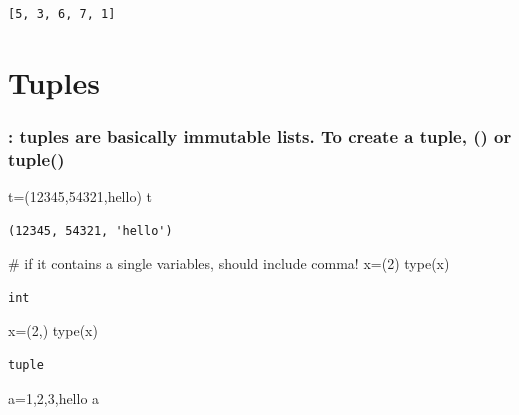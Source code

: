 \documentclass[
  a4paper,
  DIV=11,
  numbers=noendperiod]{scrreprt}
\newenvironment{Shaded}{\begin{snugshade}}{\end{snugshade}}
\newcommand{\BuiltInTok}[1]{\textcolor[rgb]{0.00,0.23,0.31}{#1}}
\newcommand{\CommentTok}[1]{\textcolor[rgb]{0.37,0.37,0.37}{#1}}
\newcommand{\DecValTok}[1]{\textcolor[rgb]{0.68,0.00,0.00}{#1}}
\newcommand{\NormalTok}[1]{\textcolor[rgb]{0.00,0.23,0.31}{#1}}
\newcommand{\OperatorTok}[1]{\textcolor[rgb]{0.37,0.37,0.37}{#1}}
\newcommand{\StringTok}[1]{\textcolor[rgb]{0.13,0.47,0.30}{#1}}
\begin{document}
\begin{verbatim}
[5, 3, 6, 7, 1]
\end{verbatim}

\section{Tuples}\label{tuples}

\subsubsection{: tuples are basically immutable lists. To create a
tuple, () or
tuple()}\label{tuples-are-basically-immutable-lists.-to-create-a-tuple-or-tuple}

\begin{Shaded}
\begin{Highlighting}[]
\NormalTok{t}\OperatorTok{=}\NormalTok{(}\DecValTok{12345}\NormalTok{,}\DecValTok{54321}\NormalTok{,}\StringTok{\textquotesingle{}hello\textquotesingle{}}\NormalTok{)}
\NormalTok{t}
\end{Highlighting}
\end{Shaded}

\begin{verbatim}
(12345, 54321, 'hello')
\end{verbatim}

\begin{Shaded}
\begin{Highlighting}[]
\CommentTok{\# if it contains a single variables, should include comma!}
\NormalTok{x}\OperatorTok{=}\NormalTok{(}\DecValTok{2}\NormalTok{)}
\BuiltInTok{type}\NormalTok{(x)}
\end{Highlighting}
\end{Shaded}

\begin{verbatim}
int
\end{verbatim}

\begin{Shaded}
\begin{Highlighting}[]
\NormalTok{x}\OperatorTok{=}\NormalTok{(}\DecValTok{2}\NormalTok{,)}
\BuiltInTok{type}\NormalTok{(x)}
\end{Highlighting}
\end{Shaded}

\begin{verbatim}
tuple
\end{verbatim}

\begin{Shaded}
\begin{Highlighting}[]
\NormalTok{a}\OperatorTok{=}\DecValTok{1}\NormalTok{,}\DecValTok{2}\NormalTok{,}\DecValTok{3}\NormalTok{,}\StringTok{\textquotesingle{}hello\textquotesingle{}}
\NormalTok{a}
\end{Highlighting}
\end{Shaded}
\end{document}
